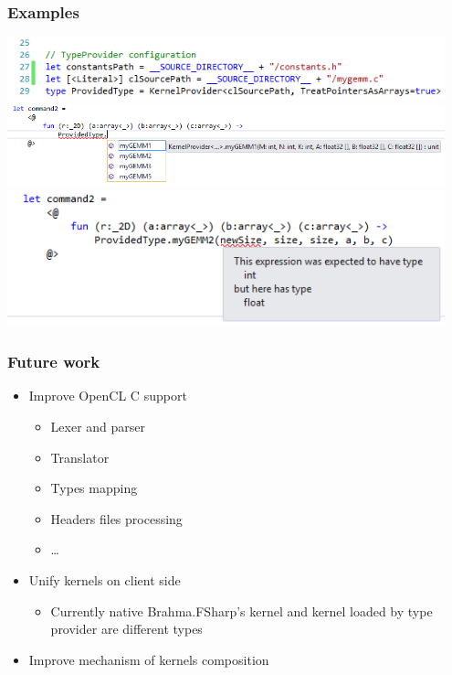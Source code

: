 \documentclass[xcolor=table]{beamer}
\begin{document}
            
\begin{frame}
  \transwipe[direction=90]
  \frametitle{Examples}         
  \includegraphics[width=0.95\textwidth]{pictures/smpl1.png}
  \\
  \includegraphics[width=0.95\textwidth]{pictures/smpl2.png}
  \\
  \includegraphics[width=0.95\textwidth]{pictures/smpl3.png}
\end{frame}     

\begin{frame}
  \transwipe[direction=90]
  \frametitle{Future work}         
\begin{itemize}
\item Improve OpenCL C support
\begin{itemize}
\item Lexer and parser
\item Translator 
\item Types mapping
\item Headers files processing
\item \dots
\end{itemize}
\item Unify kernels on client side
\begin{itemize}
\item Currently native Brahma.FSharp's kernel and kernel loaded by type provider are different 
types
\end{itemize}
\item Improve mechanism of kernels composition
\end{itemize}
\end{frame}     
            
\end{document}
